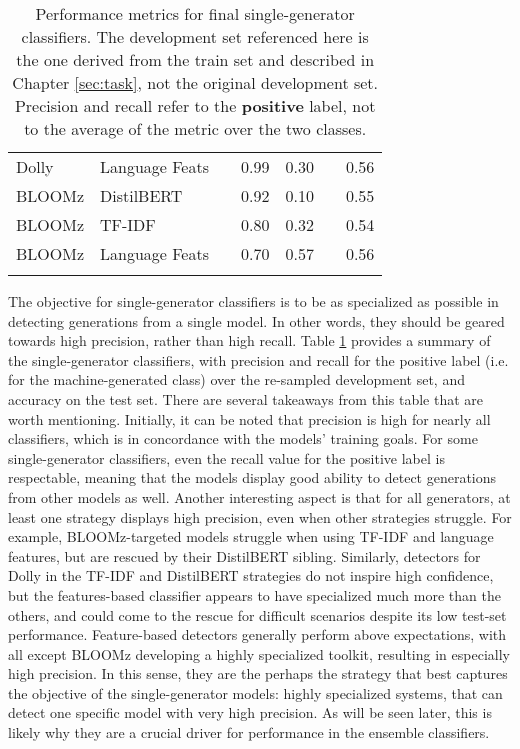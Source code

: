 \begin{table}[ht]
\begin{tabular}{llp{10px}ccp{10px}c}
        Dolly                  & Language Feats            &  & 0.99                                & 0.30          &          & 0.56            \\
        BLOOMz                 & DistilBERT                &  & 0.92                                & 0.10          &          & 0.55            \\
        BLOOMz                 & TF-IDF                    &  & 0.80                                & 0.32          &          & 0.54            \\
        BLOOMz                 & Language Feats            &  & 0.70                                & 0.57          &          & 0.56            \\
        \bottomrule
        \vspace{0.1cm}
    \end{tabular}
    \caption{
        Performance metrics for final single-generator classifiers.
        The development set referenced here is the one derived from the train set and described in Chapter \ref{sec:task}, not the original development set.
        Precision and recall refer to the \textbf{positive} label, not to the average of the metric over the two classes.
    }
    \label{tab:subsolutions-final}
\end{table}

The objective for single-generator classifiers is to be as specialized as possible in detecting generations from a single model.
In other words, they should be geared towards high precision, rather than high recall.
Table \ref{tab:subsolutions-final} provides a summary of the single-generator classifiers, with precision and recall for the positive label (i.e. for the machine-generated class) over the re-sampled development set, and accuracy on the test set.
There are several takeaways from this table that are worth mentioning.
Initially, it can be noted that precision is high for nearly all classifiers, which is in concordance with the models' training goals.
For some single-generator classifiers, even the recall value for the positive label is respectable, meaning that the models display good ability to detect generations from other models as well.
Another interesting aspect is that for all generators, at least one strategy displays high precision, even when other strategies struggle.
For example, BLOOMz-targeted models struggle when using TF-IDF and language features, but are rescued by their DistilBERT sibling.
Similarly, detectors for Dolly in the TF-IDF and DistilBERT strategies do not inspire high confidence, but the features-based classifier appears to have specialized much more than the others, and could come to the rescue for difficult scenarios despite its low test-set performance.
Feature-based detectors generally perform above expectations, with all except BLOOMz developing a highly specialized toolkit, resulting in especially high precision.
In this sense, they are the perhaps the strategy that best captures the objective of the single-generator models: highly specialized systems, that can detect one specific model with very high precision.
As will be seen later, this is likely why they are a crucial driver for performance in the ensemble classifiers.

